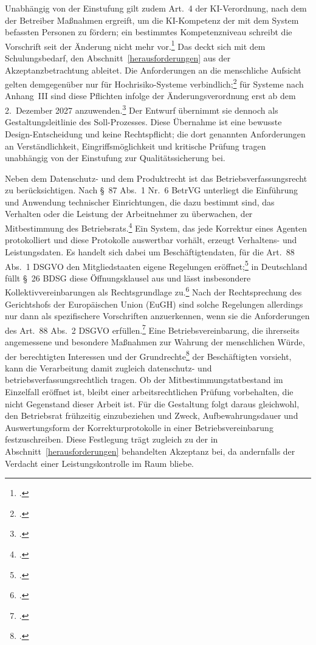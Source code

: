 Unabh\"angig von der Einstufung gilt zudem Art.~4 der KI-Verordnung, nach dem der Betreiber Ma{\ss}nahmen ergreift, um die KI-Kompetenz der mit dem System befassten Personen zu f\"ordern; ein bestimmtes Kompetenzniveau schreibt die Vorschrift seit der \"Anderung nicht mehr vor.\footcites[Vgl.][Art.~4]{KIVO}[][Art.~1 Nr.~5]{KIVO2026} Das deckt sich mit dem Schulungsbedarf, den Abschnitt~\ref{herausforderungen} aus der Akzeptanzbetrachtung ableitet. Die Anforderungen an die menschliche Aufsicht gelten demgegen\"uber nur f\"ur Hochrisiko-Systeme verbindlich;\footcite[Vgl.][Art.~14]{KIVO} f\"ur Systeme nach Anhang~III sind diese Pflichten infolge der \"Anderungsverordnung erst ab dem 2.~Dezember 2027 anzuwenden.\footcite[Vgl.][Art.~1 Nr.~40]{KIVO2026} Der Entwurf \"ubernimmt sie dennoch als Gestaltungsleitlinie des Soll-Prozesses. Diese \"Ubernahme ist eine bewusste Design-Entscheidung und keine Rechtspflicht; die dort genannten Anforderungen an Verst\"andlichkeit, Eingriffsm\"oglichkeit und kritische Pr\"ufung tragen unabh\"angig von der Einstufung zur Qualit\"atssicherung bei.

Neben dem Datenschutz- und dem Produktrecht ist das Betriebsverfassungsrecht zu ber\"ucksichtigen. Nach \S~87 Abs.~1 Nr.~6 BetrVG unterliegt die Einf\"uhrung und Anwendung technischer Einrichtungen, die dazu bestimmt sind, das Verhalten oder die Leistung der Arbeitnehmer zu \"uberwachen, der Mitbestimmung des Betriebsrats.\footcite[Vgl.][\S~87 Abs.~1 Nr.~6]{BetrVG} Ein System, das jede Korrektur eines Agenten protokolliert und diese Protokolle auswertbar vorh\"alt, erzeugt Verhaltens- und Leistungsdaten. Es handelt sich dabei um Besch\"aftigtendaten, f\"ur die Art.~88 Abs.~1 DSGVO den Mitgliedstaaten eigene Regelungen er\"offnet;\footcite[Vgl.][Art.~88 Abs.~1]{DSGVO} in Deutschland f\"ullt \S~26 BDSG diese \"Offnungsklausel aus und l\"asst insbesondere Kollektivvereinbarungen als Rechtsgrundlage zu.\footcite[Vgl.][\S~26]{BDSG} Nach der Rechtsprechung des Gerichtshofs der Europ\"aischen Union (EuGH) sind solche Regelungen allerdings nur dann als spezifischere Vorschriften anzuerkennen, wenn sie die Anforderungen des Art.~88 Abs.~2 DSGVO erf\"ullen.\footcites[Vgl.][Art.~88 Abs.~2]{DSGVO}[][Rn.~74\,f.]{EuGH2023} Eine Betriebsvereinbarung, die ihrerseits \glqq angemessene und besondere Ma{\ss}nahmen zur Wahrung der menschlichen W\"urde, der berechtigten Interessen und der Grundrechte\grqq{}\footcite[Art.~88 Abs.~2]{DSGVO} der Besch\"aftigten vorsieht, kann die Verarbeitung damit zugleich datenschutz- und betriebsverfassungsrechtlich tragen. Ob der Mitbestimmungstatbestand im Einzelfall er\"offnet ist, bleibt einer arbeitsrechtlichen Pr\"ufung vorbehalten, die nicht Gegenstand dieser Arbeit ist. F\"ur die Gestaltung folgt daraus gleichwohl, den Betriebsrat fr\"uhzeitig einzubeziehen und Zweck, Aufbewahrungsdauer und Auswertungsform der Korrekturprotokolle in einer Betriebsvereinbarung festzuschreiben. Diese Festlegung tr\"agt zugleich zu der in Abschnitt~\ref{herausforderungen} behandelten Akzeptanz bei, da andernfalls der Verdacht einer Leistungskontrolle im Raum bliebe.

